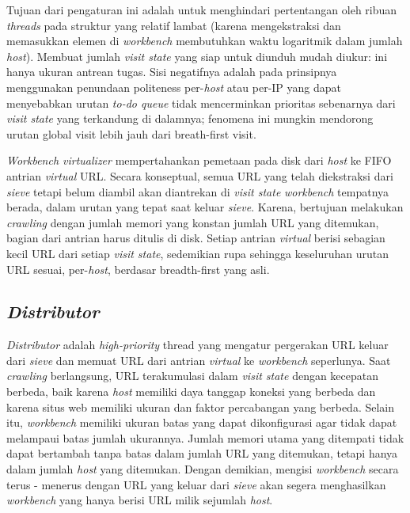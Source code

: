 Tujuan dari pengaturan ini adalah untuk menghindari pertentangan oleh ribuan \emph{threads} pada struktur yang relatif lambat (karena mengekstraksi dan memasukkan elemen di \emph{workbench} membutuhkan waktu logaritmik dalam jumlah \emph{host}). Membuat jumlah \emph{visit state} yang siap untuk diunduh mudah diukur: ini hanya ukuran antrean tugas. Sisi negatifnya adalah pada prinsipnya menggunakan penundaan politeness per-\emph{host} atau per-IP yang dapat menyebabkan urutan \emph{to-do queue} tidak mencerminkan prioritas sebenarnya dari \emph{visit state} yang terkandung di dalamnya; fenomena ini mungkin mendorong urutan global visit lebih jauh dari breath-first visit.
	
\emph{Workbench virtualizer} mempertahankan pemetaan pada disk dari \emph{host} ke FIFO antrian \emph{virtual} URL. Secara konseptual, semua URL yang telah diekstraksi dari \emph{sieve} tetapi belum diambil akan diantrekan di \emph{visit state} \emph{workbench} tempatnya berada, dalam urutan yang tepat saat keluar \emph{sieve}. Karena, bertujuan melakukan \emph{crawling} dengan jumlah memori yang konstan jumlah URL yang ditemukan, bagian dari antrian harus ditulis di disk. Setiap antrian \emph{virtual} berisi sebagian kecil URL dari setiap \emph{visit state}, sedemikian rupa sehingga keseluruhan urutan URL sesuai, per-\emph{host}, berdasar breadth-first yang asli.

\subsection{\emph{Distributor}}

\emph{Distributor} adalah \emph{high-priority} thread yang mengatur pergerakan URL keluar dari \emph{sieve} dan memuat URL dari antrian \emph{virtual} ke \emph{workbench} seperlunya. Saat \emph{crawling} berlangsung, URL terakumulasi dalam \emph{visit state} dengan kecepatan berbeda, baik karena \emph{host} memiliki daya tanggap koneksi yang berbeda dan karena situs web memiliki ukuran dan faktor percabangan yang berbeda. Selain itu, \emph{workbench} memiliki ukuran batas yang dapat dikonfigurasi agar tidak dapat melampaui batas jumlah ukurannya. Jumlah memori utama yang ditempati tidak dapat bertambah tanpa batas dalam jumlah URL yang ditemukan, tetapi hanya dalam jumlah \emph{host} yang ditemukan. Dengan demikian, mengisi \emph{workbench} secara terus - menerus dengan URL yang keluar dari \emph{sieve} akan segera menghasilkan \emph{workbench} yang hanya berisi URL milik sejumlah \emph{host}. 

